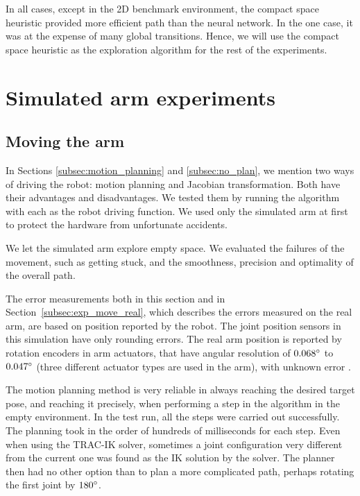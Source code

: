 \documentclass[buriama8_dp.tex]{subfiles}
\begin{document}
In all cases, except in the 2D benchmark environment, the compact space heuristic provided more efficient path than the neural network. In the one case, it was at the expense of many global transitions. Hence, we will use the compact space heuristic as the exploration algorithm for the rest of the experiments.


\section{Simulated arm experiments}
\label{sec:exp_sim_arm}

\subsection{Moving the arm}
\label{subsec:exp_move_sim}

In Sections \ref{subsec:motion_planning} and \ref{subsec:no_plan}, we mention two ways of driving the robot: motion planning and Jacobian transformation. Both have their advantages and disadvantages. We tested them by running the algorithm with each as the robot driving function. We used only the simulated arm at first to protect the hardware from unfortunate accidents.

We let the simulated arm explore empty space. We evaluated the failures of the movement, such as getting stuck, and the smoothness, precision and optimality of the overall path.

The error measurements both in this section and in Section~\ref{subsec:exp_move_real}, which describes the errors measured on the real arm, are based on position reported by the robot. The joint position sensors in this simulation have only rounding errors. The real arm position is reported by rotation encoders in arm actuators, that have angular resolution of \(0.068^\circ\) to \(0.047^\circ\) (three different actuator types are used in the arm), with unknown error \cite{jaco_joint_spec}.

The motion planning method is very reliable in always reaching the desired target pose, and reaching it precisely, when performing a step in the algorithm in the empty environment. In the test run, all the steps were carried out successfully. The planning took in the order of hundreds of milliseconds for each step. Even when using the TRAC-IK solver, sometimes a joint configuration  very different from the current one was found as the IK solution by the solver. The planner then had no other option than to plan a more complicated path, perhaps rotating the first joint by \(180^\circ\).
\end{document}
